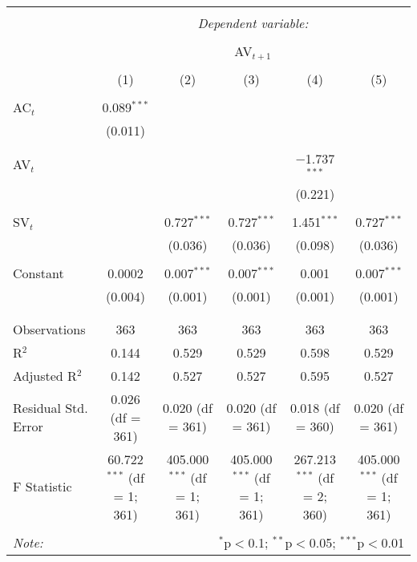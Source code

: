 
\begin{table}[!htbp] \centering 
  \caption{} 
  \label{} 
\begin{tabular}{@{\extracolsep{5pt}}lccccc} 
\\[-1.8ex]\hline 
\hline \\[-1.8ex] 
 & \multicolumn{5}{c}{\textit{Dependent variable:}} \\ 
\cline{2-6} 
\\[-1.8ex] & \multicolumn{5}{c}{AV$_{t+1}$} \\ 
\\[-1.8ex] & (1) & (2) & (3) & (4) & (5)\\ 
\hline \\[-1.8ex] 
 AC$_{t}$ & 0.089$^{***}$ &  &  &  &  \\ 
  & (0.011) &  &  &  &  \\ 
  & & & & & \\ 
 AV$_{t}$ &  &  &  & $-$1.737$^{***}$ &  \\ 
  &  &  &  & (0.221) &  \\ 
  & & & & & \\ 
 SV$_{t}$ &  & 0.727$^{***}$ & 0.727$^{***}$ & 1.451$^{***}$ & 0.727$^{***}$ \\ 
  &  & (0.036) & (0.036) & (0.098) & (0.036) \\ 
  & & & & & \\ 
 Constant & 0.0002 & 0.007$^{***}$ & 0.007$^{***}$ & 0.001 & 0.007$^{***}$ \\ 
  & (0.004) & (0.001) & (0.001) & (0.001) & (0.001) \\ 
  & & & & & \\ 
\hline \\[-1.8ex] 
Observations & 363 & 363 & 363 & 363 & 363 \\ 
R$^{2}$ & 0.144 & 0.529 & 0.529 & 0.598 & 0.529 \\ 
Adjusted R$^{2}$ & 0.142 & 0.527 & 0.527 & 0.595 & 0.527 \\ 
Residual Std. Error & 0.026 (df = 361) & 0.020 (df = 361) & 0.020 (df = 361) & 0.018 (df = 360) & 0.020 (df = 361) \\ 
F Statistic & 60.722$^{***}$ (df = 1; 361) & 405.000$^{***}$ (df = 1; 361) & 405.000$^{***}$ (df = 1; 361) & 267.213$^{***}$ (df = 2; 360) & 405.000$^{***}$ (df = 1; 361) \\ 
\hline 
\hline \\[-1.8ex] 
\textit{Note:}  & \multicolumn{5}{r}{$^{*}$p$<$0.1; $^{**}$p$<$0.05; $^{***}$p$<$0.01} \\ 
\end{tabular} 
\end{table} 
